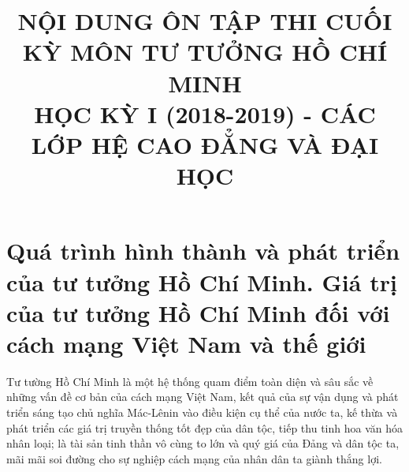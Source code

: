 \documentclass{article}
\title{NỘI DUNG ÔN TẬP THI CUỐI KỲ MÔN TƯ TƯỞNG HỒ CHÍ MINH\\ HỌC KỲ I (2018-2019) - CÁC LỚP HỆ CAO ĐẲNG VÀ ĐẠI HỌC}
\begin{document}
	\maketitle
	\section {Quá trình hình thành và phát triển của tư tưởng Hồ Chí Minh. Giá trị của tư tưởng Hồ Chí Minh đối với cách mạng Việt Nam và thế giới}
	Tư tường Hồ Chí Minh là một hệ thống quam điểm toàn diện và sâu sắc về những vấn đề cơ bản của cách mạng Việt Nam, kết quả của sự vận dụng và phát triển sáng tạo chủ nghĩa Mác-Lênin vào điều kiện cụ thể của nước ta, kế thừa và phát triển các giá trị truyền thống tốt đẹp của dân tộc, tiếp thu tinh hoa văn hóa nhân loại; là tài sản tinh thần vô cùng to lớn và quý giá của Đảng và dân tộc ta, mãi mãi soi đường cho sự nghiệp cách mạng của nhân dân ta giành thắng lợi.\\

\end{document}
